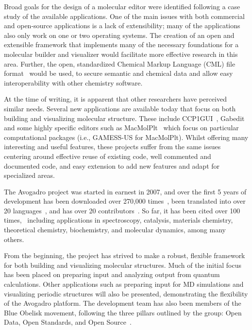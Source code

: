 \documentclass[10pt]{bmc_article}
\newenvironment{bmcformat}{\begin{raggedright}
\baselineskip20pt\sloppy\setboolean{publ}{false}}{\end{raggedright}
\baselineskip20pt\sloppy}
\begin{document}
\begin{bmcformat}
Broad goals for the design of a molecular editor were identified following a
case study of the available applications. One of the main issues with both
commercial and open-source applications is a lack of extensibility; many of the
applications also only work on one or two operating systems. The
creation of an open and extensible framework that implements many of the necessary foundations
for a molecular builder and visualizer would facilitate more effective research
in this area. Further, the open, standardized Chemical Markup Language
(CML) file format~\cite{CML2011a, CML2011b} would be used, to secure
semantic and chemical data and allow easy interoperability with other
chemistry software.

At the time of writing, it is apparent that other researchers have perceived
similar needs. Several new applications are available today that focus on both
building and visualizing molecular structure. These include
CCP1GUI~\cite{CCP1GUI}, Gabedit~\cite{Gabedit} and some highly specific
editors such as MacMolPlt~\cite{MacMolPlt} which focus on particular
computational packages (i.e., GAMESS-US for MacMolPlt). Whilst offering many
interesting and
useful features, these projects suffer from the same issues centering
around effective reuse of existing code, well commented and documented code, and
easy extension to add new features and adapt for specialized areas.

The Avogadro project was started in earnest in 2007, and over the
first 5 years of development has been downloaded over 270,000
times~\cite{Downloads}, been translated into over 20
languages~\cite{Translations}, and has over 20
contributors~\cite{OhlohContributors}. So far, it has been cited over
100 times,~\cite{ScholarCitations} including applications in spectroscopy, catalysis,
materials chemistry, theoretical chemistry, biochemistry, and
molecular dynamics, among many
others.~\cite{MeraAdasme:2011hj,Closser:2010kc,Ide:2011cj}
\cite{Menegazzo:2012by,Patel:2011fe,Popov:2011gv,Hu:2011ce,Bingol:2012kx}
\cite{Yao:2010id,Fleisher:2011vz,Mayorkas:2011eu,Tian:2011ej,Kapla:2012ho}
\cite{Mandal:2012ff,Bernstein:2010kc,Hlawacek:2011gh,Forster:2012ka}
\cite{Burkhardt:2010kc,Burkhardt:2011hn,Madison:2011kw}

From the beginning, the project
has strived to make a robust, flexible framework for
both building and visualizing molecular structures. Much of the initial focus
has been placed on preparing input and analyzing output from quantum
calculations. Other applications such as preparing input for MD simulations and
visualizing periodic structures will also be presented, demonstrating the
flexibility of the Avogadro platform. The development team has also been
members of the Blue Obelisk movement, following the three pillars outlined by
the group: Open Data, Open Standards, and Open Source~\cite{BlueObelisk2006,
BlueObelisk2011}.


\end{bmcformat}
\end{document}
